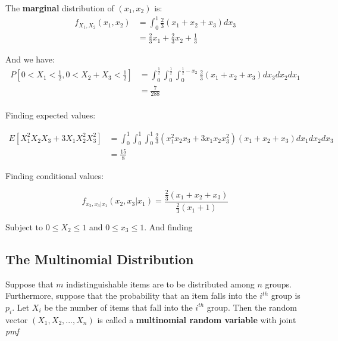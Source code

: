 \documentclass{article}
\begin{document}
The \textbf{marginal} distribution of $(x_1,x_2)$ is:
\begin{equation*}
    \begin{split}
        f_{X_1,X_2}(x_1,x_2) &= \int_0^1 \frac{2}{3}(x_1+x_2+x_3) dx_3\\
        &= \frac{2}{3}x_1 + \frac{2}{3}x_2 + \frac{1}{3}
    \end{split}
\end{equation*}

And we have:
\begin{equation*}
\begin{split}
    P\left[0 < X_1 < \frac{1}{2}, 0 < X_2 + X_3 < \frac{1}{2} \right] &= \int_{0}^{\frac{1}{2}} \int_{0}^{\frac{1}{2}} \int_{0}^{\frac{1}{2}-x_2} \frac{2}{3} (x_1 + x_2 + x_3) dx_3 dx_2 dx_1\\
    &= \frac{7}{288}\\
\end{split}
\end{equation*}


Finding expected values:

\begin{equation*}
    \begin{split}
         E[X_1^2 X_2 X_3 + 3 X_1 X_2^2 X_3^2] &= \int_0^1 \int_0^1 \int_0^1 \frac{2}{3}(x_1^2 x_2 x_3 + 3 x_1 x_2 x_3^2) (x_1 + x_2 + x_3) dx_1 dx_2 dx_3\\
    &= \frac{15}{8}
    \end{split}
\end{equation*}

Finding conditional values:

\begin{equation*}
    f_{x_2,x_3|x_1}(x_2,x_3|x_1) = \frac{\frac{2}{3}(x_1+x_2+x_3)}{\frac{2}{3}(x_1+1)}
\end{equation*}

Subject to $0 \leq X_2 \leq 1$ and $0 \leq x_3 \leq 1$. And finding 



\subsection{The Multinomial Distribution}

Suppose that $m$ indistinguishable items are to be distributed among $n$ groups. Furthermore, suppose that the probability that an item falls into the $i^{th}$ group is $p_i$. Let $X_i$ be the number of items that fall into the $i^{th}$ group. Then the random vector $(X_1,X_2,...,X_n)$ is called a \textbf{multinomial random variable} with joint \textit{pmf}
\end{document}
